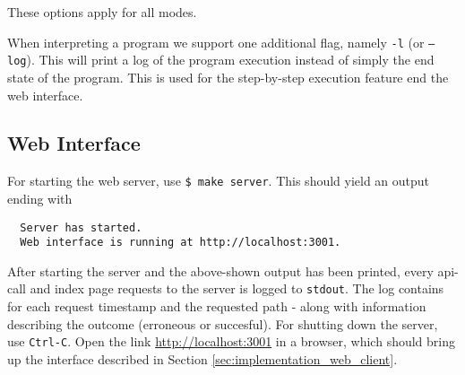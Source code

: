 These options apply for all modes.

When interpreting a program we support one additional flag, namely \texttt{-l} (or \texttt{--log}). This will print a log of the program execution instead of simply the end state of the program. This is used for the step-by-step execution feature end the web interface.

\subsection{Web Interface}

For starting the web server, use \texttt{\$ make server}. This should yield an output ending with
\begin{lstlisting}
  Server has started.
  Web interface is running at http://localhost:3001.
\end{lstlisting}
After starting the server and the above-shown output has been printed, every api-call and index page requests to the server is logged to \texttt{stdout}.
The log contains for each request timestamp and the requested path - along with information describing the outcome (erroneous or succesful).
For shutting down the server, use \texttt{Ctrl-C}.
Open the link \url{http://localhost:3001} in a browser, which should bring up the interface described in Section \ref{sec:implementation_web_client}.
